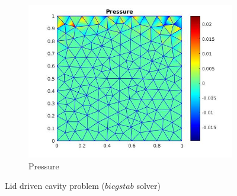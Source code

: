 \documentclass{beamer}
\begin{document}
\begin{frame}
\begin{figure}
\begin{subfigure}{0.3\textwidth}
  \includegraphics[width=\linewidth]{lid_bicgstab_pressure.jpg}
  \caption{Pressure} 
  \label{pressure_stoke_bicgstab_lid}
\end{subfigure}
\caption{Lid driven cavity problem ($bicgstab$ solver)}
\label{stoke_bicgstab_lid}
\end{figure}
\end{frame}
\end{document}
